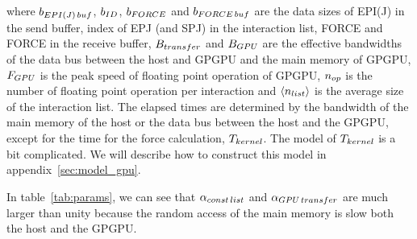 \documentclass[dvipdfmx]{pasj01}
\begin{document}
where $b_{\rm EPI(J)\, buf}$, $b_{\rm ID}$, $b_{\rm FORCE}$ and
$b_{\rm FORCE\, buf}$ are the data sizes of EPI(J) in the send buffer,
index of EPJ (and SPJ) in the interaction list, FORCE and FORCE in the
receive buffer, $B_{\rm transfer}$ and $B_{\rm GPU}$ are the effective
bandwidths of the data bus between the host and GPGPU and the main
memory of GPGPU, $F_{\rm GPU}$ is the peak speed of floating point
operation of GPGPU, $n_{\rm op}$ is the number of floating point
operation per interaction and $\langle n_{\rm list} \rangle$ is the
average size of the interaction list. The elapsed times are determined
by the bandwidth of the main memory of the host or the data bus
between the host and the GPGPU, except for the time for the force
calculation, $T_{\rm kernel}$. The model of $T_{\rm kernel}$ is a bit
complicated. We will describe how to construct this model in
appendix~\ref{sec:model_gpu}.


In table~\ref{tab:params}, we can see that $\alpha_{\rm const\, list}$
and $\alpha_{\rm GPU\, transfer}$ are much larger than unity because
the random access of the main memory is slow both the host and the
GPGPU.
\end{document}
